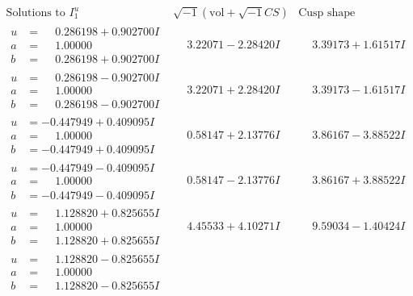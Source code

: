 \documentclass[1p]{elsarticle_modified}
\theoremstyle{definition}
\newcommand{\I}{\sqrt{-1}}
\begin{document}
$$\begin{array}{c|c|c}  
\text{Solutions to }I^u_{1}& \I (\text{vol} + \sqrt{-1}CS) & \text{Cusp shape}\\
 \hline 
\begin{aligned}
u &= \phantom{-}0.286198 + 0.902700 I \\
a &= \phantom{-}1.00000\phantom{ +0.000000I} \\
b &= \phantom{-}0.286198 + 0.902700 I\end{aligned}
 & \phantom{-}3.22071 - 2.28420 I & \phantom{-}3.39173 + 1.61517 I \\ \hline\begin{aligned}
u &= \phantom{-}0.286198 - 0.902700 I \\
a &= \phantom{-}1.00000\phantom{ +0.000000I} \\
b &= \phantom{-}0.286198 - 0.902700 I\end{aligned}
 & \phantom{-}3.22071 + 2.28420 I & \phantom{-}3.39173 - 1.61517 I \\ \hline\begin{aligned}
u &= -0.447949 + 0.409095 I \\
a &= \phantom{-}1.00000\phantom{ +0.000000I} \\
b &= -0.447949 + 0.409095 I\end{aligned}
 & \phantom{-}0.58147 + 2.13776 I & \phantom{-}3.86167 - 3.88522 I \\ \hline\begin{aligned}
u &= -0.447949 - 0.409095 I \\
a &= \phantom{-}1.00000\phantom{ +0.000000I} \\
b &= -0.447949 - 0.409095 I\end{aligned}
 & \phantom{-}0.58147 - 2.13776 I & \phantom{-}3.86167 + 3.88522 I \\ \hline\begin{aligned}
u &= \phantom{-}1.128820 + 0.825655 I \\
a &= \phantom{-}1.00000\phantom{ +0.000000I} \\
b &= \phantom{-}1.128820 + 0.825655 I\end{aligned}
 & \phantom{-}4.45533 + 4.10271 I & \phantom{-}9.59034 - 1.40424 I \\ \hline\begin{aligned}
u &= \phantom{-}1.128820 - 0.825655 I \\
a &= \phantom{-}1.00000\phantom{ +0.000000I} \\
b &= \phantom{-}1.128820 - 0.825655 I\end{aligned}

\end{array}$$
\end{document}
